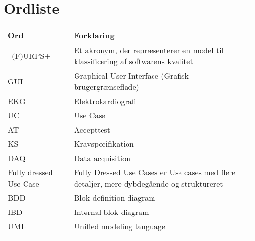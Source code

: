 \chapter{Ordliste}


\begin{longtabu} to 
    Ord &    Forklaring\\
    \toprule \
    (F)URPS+ &    Et akronym, der repræsenterer en model til klassificering af softwarens kvalitet\\
    GUI		&	Graphical User Interface (Grafisk brugergrænseflade)\\
    EKG		&	Elektrokardiografi\\
    UC		&	Use Case\\
    AT		&	Accepttest\\
    KS		&	Kravspecifikation\\
    DAQ		&	Data acquisition\\
    Fully dressed Use Case 	&	Fully Dressed Use Cases er Use cases med flere detaljer, mere dybdegående og struktureret\\
    BDD		&	Blok definition diagram\\
    IBD		&	Internal blok diagram\\
    UML		&	Unifled modeling language\\  
\label{forkort}
\end{longtabu}